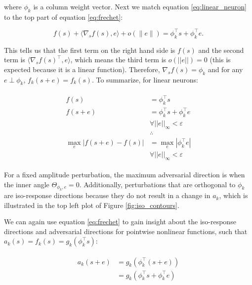 where $\phi_{k}$ is a column weight vector. Next we match equation \ref{eq:linear_neuron} to the top part of equation \ref{eq:frechet}:

\begin{equation}
    f(s) + \langle\nabla_{s}f(s), e\rangle + o(\|e\|) = \phi_{k}^\top s + \phi_{k}^\top e.
\end{equation}

This tells us that the first term on the right hand side is $f(s)$ and the second term is $\langle\nabla_{s}f(s)^\top, e\rangle$, which means the third term is $o(||e||)=0$ (this is expected because it is a linear function). Therefore,  $\nabla_{s}f(s) = \phi_{k}$ and for any $e \perp \phi_{k}$, $f_{k}(s+e) = f_{k}(s)$. To summarize, for linear neurons:

\begin{align}\label{eq:parallel_adv_proof}
\begin{split}
    f(s) &= \phi_{k}^\top s \\
    f(s+e) &= \phi_{k}^\top s + \phi_{k}^\top e \\
    &\forall ||e||_{\infty} < \varepsilon \\
    &\therefore \\
    \max_{e} | f(s+e) - f(s) | &= \max_{e} | \phi_{k}^\top e | \\
    & \forall ||e||_{\infty} < \varepsilon
\end{split}
\end{align}

For a fixed amplitude perturbation, the maximum adversarial direction is when the inner angle $\Theta_{\phi_{k},e} = 0$. Additionally, perturbations that are orthogonal to $\phi_{k}$ are iso-response directions because they do not result in a change in $a_{k}$, which is illustrated in the top left plot of Figure \ref{fig:iso_contours}.

We can again use equation \ref{eq:frechet} to gain insight about the iso-response directions and adversarial directions for pointwise nonlinear functions, such that $a_{k}(s) = f_{k}(s) = g_{k}(\phi_{k}^\top s)$:

\begin{align}\label{eq:pw_nonlin}
\begin{split}
  a_{k}(s+e) &= g_{k}(\phi_{k}^\top(s+e)) \\
  &=g_{k}(\phi_{k}^\top s + \phi_{k}^\top e) \\
\end{split}
\end{align}

